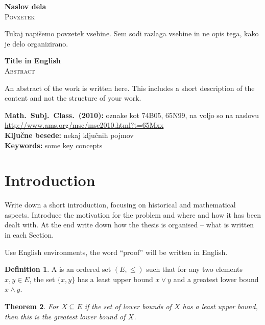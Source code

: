 \documentclass[12pt,a4paper,twoside]{article}
\newcommand{\naslovdela}{Naslov dela}
\newcommand{\englishtitle}{Title in English}
\theoremstyle{definition} %
\newtheorem{definition}{Definition}[section]
\theoremstyle{plain} %
\newtheorem{theorem}[definition]{Theorem}
\numberwithin{equation}{section}  %
\begin{document}
\begin{center}
\textbf{\naslovdela} \\[3mm]
\textsc{Povzetek} \\[2mm]
\end{center}
Tukaj napišemo povzetek vsebine. Sem sodi razlaga vsebine in ne opis tega, kako je delo
organizirano.

\vfill
\begin{center}
\textbf{\englishtitle} \\[3mm] %
\textsc{Abstract}\\[2mm]
\end{center}

An abstract of the work is written here. This includes a short description of
the content and not the structure of your work.

\vfill\noindent
\textbf{Math.~Subj.~Class.~(2010):} oznake kot 74B05, 65N99, na voljo so na naslovu
\url{http://www.ams.org/msc/msc2010.html?t=65Mxx} \\[1mm]
\textbf{Ključne besede:} nekaj ključnih pojmov \\[1mm]
\textbf{Keywords:} some key concepts

\cleardoublepage

\setcounter{page}{1}    %

\section{Introduction}
Write down a short introduction, focusing on historical and mathematical aspects. Introduce the
motivation for the problem and where and how it has been dealt with. At the end write down how the
thesis is organised -- what is written in each Section.

Use English environments, the word ``proof'' will be written in English.
\begin{definition}
A \emph{} is an ordered set $(E, \leq)$ such that for any two elements $x,y \in E$,
the set $\{x,y\}$ has a least upper bound $x \vee y$ and a greatest lower bound $x \wedge y$.
\end{definition}

\begin{theorem}
For $X \subseteq E$ if the set of lower bounds of $X$ has a least upper bound, then this is the
greatest lower bound of $X$.
\end{theorem}
\end{document}
